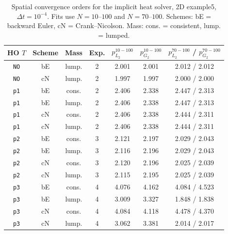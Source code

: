 \begin{table}[htbp]
\centering
\scriptsize
\caption{Spatial convergence orders for the implicit heat solver, 2D example5, $\Delta t=10^{-4}$. Fits use $N=10$--$100$ and $N=70$--$100$. Schemes: bE = backward Euler, cN = Crank--Nicolson. Mass: cons. = consistent, lump. = lumped.}
\label{tab:heat-implicit-orders-2D-1p0em04}
\begin{tabular}{ccccccc}
\toprule
HO $T$ & Scheme & Mass & Exp. & $p_{L_2}^{10-100}$ & $p_{G_2}^{10-100}$ & $p_{L_2}^{70-100}$ / $p_{G_2}^{70-100}$ \\
\midrule
\texttt{NO} & bE & lump. & 2 & 2.001 & 2.001 & 2.012 / 2.012 \\
\texttt{NO} & cN & lump. & 2 & 1.997 & 1.997 & 2.000 / 2.000 \\\hline
\texttt{p1} & bE & cons. & 2 & 2.406 & 2.338 & 2.447 / 2.313 \\
\texttt{p1} & bE & lump. & 2 & 2.406 & 2.338 & 2.447 / 2.313 \\
\texttt{p1} & cN & cons. & 2 & 2.406 & 2.338 & 2.444 / 2.311 \\
\texttt{p1} & cN & lump. & 2 & 2.406 & 2.338 & 2.444 / 2.311 \\\hline
\texttt{p2} & bE & cons. & 3 & 2.121 & 2.197 & 2.029 / 2.043 \\
\texttt{p2} & bE & lump. & 3 & 2.116 & 2.196 & 2.029 / 2.043 \\
\texttt{p2} & cN & cons. & 3 & 2.120 & 2.196 & 2.025 / 2.039 \\
\texttt{p2} & cN & lump. & 3 & 2.115 & 2.195 & 2.025 / 2.039 \\\hline
\texttt{p3} & bE & cons. & 4 & 4.076 & 4.162 & 4.084 / 4.523 \\
\texttt{p3} & bE & lump. & 4 & 3.009 & 3.327 & 1.848 / 1.838 \\
\texttt{p3} & cN & cons. & 4 & 4.084 & 4.118 & 4.478 / 4.370 \\
\texttt{p3} & cN & lump. & 4 & 3.062 & 3.381 & 2.014 / 2.017 \\
\bottomrule
\end{tabular}
\end{table}
